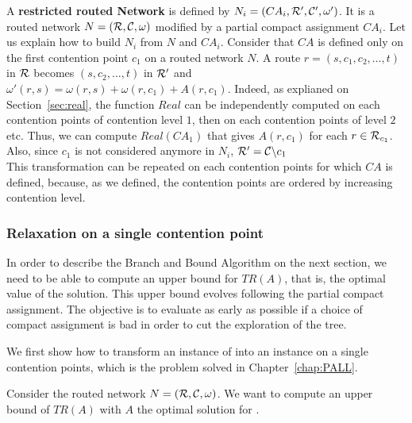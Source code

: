 A \textbf{restricted routed Network} is defined by $N_i = (CA_i,{\cal R}',{\cal C}',\omega')$. It is a routed network $N = ({\cal R},{\cal C},\omega)$ modified by a partial compact assignment $CA_i$.
Let us explain how to build $N_i$ from $N$ and $CA_i$.
Consider that $CA$ is defined only on the first contention point $c_1$ on a routed network $N$.
A route $r = (s,c_1,c_2,\ldots,t)$ in ${\cal R}$ becomes $(s,c_2,\ldots,t)$ in ${\cal R}'$ and $\omega'(r,s) = \omega(r,s)+\omega(r,c_1) + A(r,c_1)$. Indeed, as explianed on Section~\ref{sec:real}, the function $Real$ can be independently computed on each contention points of contention level $1$, then on each contention points of level $2$ etc. Thus, we can compute $Real(CA_1)$ that gives $A(r,c_1)$ for each $r \in {\cal R}_{c_1}$. Also, since $c_1$ is not considered anymore in $N_i$, ${\cal R}' = {\cal C} \backslash {c_1}$\\
This transformation can be repeated on each contention points for which $CA$ is defined, because, as we defined, the contention points are ordered by increasing contention level.

\subsubsection{Relaxation on a single contention point}

In order to describe the Branch and Bound Algorithm on the next section, we need to be able to compute an upper bound for $TR(A)$, that is, the optimal value of the solution. This upper bound evolves following the partial compact assignment. The objective is to evaluate as early as possible if a choice of compact assignment is bad in order to cut the exploration of the tree.

We first show how to transform an instance of \spall into an instance on a single contention points, which is the problem \wta solved in Chapter~\ref{chap:PALL}. 

Consider the routed network $N = ({\cal R},{\cal C},\omega)$. We want to compute an upper bound of $TR(A)$ with $A$ the optimal solution for \spall. 

